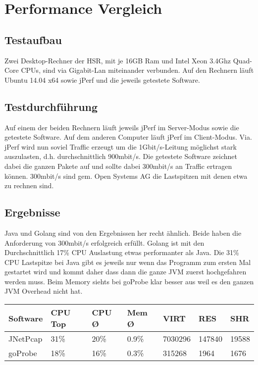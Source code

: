 \section{Performance Vergleich}
\label{sec:Performance Vergleich}

\subsection{Testaufbau}
Zwei Desktop-Rechner der HSR, mit je 16GB Ram und Intel Xeon 3.4Ghz Quad-Core CPUs, sind via Gigabit-Lan miteinander verbunden. Auf den Rechnern läuft Ubuntu 14.04 x64 sowie jPerf und die jeweils getestete Software.


\subsection{Testdurchführung}
Auf einem der beiden Rechnern läuft jeweils jPerf im Server-Modus sowie die getestete Software. Auf dem anderen Computer läuft jPerf im Client-Modus.
Via. jPerf wird nun soviel Traffic erzeugt um die 1Gbit/s-Leitung möglichst stark auszulasten, d.h. durchschnittlich 900mbit/s. Die getestete Software zeichnet dabei die ganzen Pakete auf und sollte dabei 300mbit/s an Traffic ertragen können. 300mbit/s sind gem. Open Systems AG die Lastspitzen mit denen etwa zu rechnen sind.

\subsection{Ergebnisse}
Java und Golang sind von den Ergebnissen her recht ähnlich. Beide haben die Anforderung von 300mbit/s erfolgreich erfüllt. Golang ist mit den Durchschnittlich 17\% CPU Auslastung etwas performanter als Java. Die 31\% CPU Lastspitze bei Java gibt es jeweils nur wenn das Programm zum ersten Mal gestartet wird und kommt daher dass dann die ganze \acs{JVM} zuerst hochgefahren werden muss.
Beim Memory siehts bei goProbe klar besser aus weil es den ganzen \acs{JVM} Overhead nicht hat.

\begin{table}[h]
\begin{tabular}{|l|l|l|l|l|l|l|}
\hline
\rowcolor[HTML]{C0C0C0} 
\textbf{Software} & \textbf{CPU Top} & \textbf{CPU Ø} & \textbf{Mem Ø} & \textbf{VIRT\footnotemark[1]} & \textbf{RES\footnotemark[2]} & \textbf{SHR\footnotemark[3]} \\ \hline
JNetPcap          & 31\%             & 20\%           & 0.9\%          & 7030296       & 147840       & 19588        \\ \hline
goProbe           & 18\%             & 16\%           & 0.3\%          & 315268        & 1964         & 1676         \\ \hline
\end{tabular}
\end{table}

